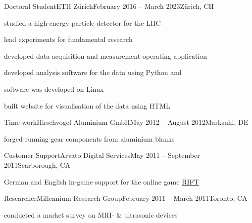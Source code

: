 \begin{cveventi}{Doctoral Student}{ETH Zürich}{February 2016 -- March 2023}{Z\"urich, CH}
  \item studied a high-energy particle detector for the LHC
  \item lead experiments for fundamental research
  \item developed data-acquisition and measurement operating application
  \item developed analysis software for the data using Python and \cpp
  \item software was developed on Linux %
  \item built website for visualisation of the data using HTML
\end{cveventi}
\divider
\begin{cveventis}{Time-work}{Hirschvogel Aluminium GmbH}{May 2012 -- August 2012}{Marksuhl, DE}
  \item forged running gear components from aluminium blanks
\end{cveventis}
%
\divider
%
\begin{cveventis}{Customer Support}{Arvato Digital Services}{May 2011 -- September 2011}{Scarborough, CA}
  \item German and English in-game support for the online game \href{https://www.trionworlds.com/rift/en/}{RIFT}
\end{cveventis}
%
\divider
%
\begin{cveventis}{Researcher}{Millennium Research Group}{February 2011 -- March 2011}{Toronto, CA}
  \item conducted a market survey on MRI- \& ultrasonic devices
\end{cveventis}
